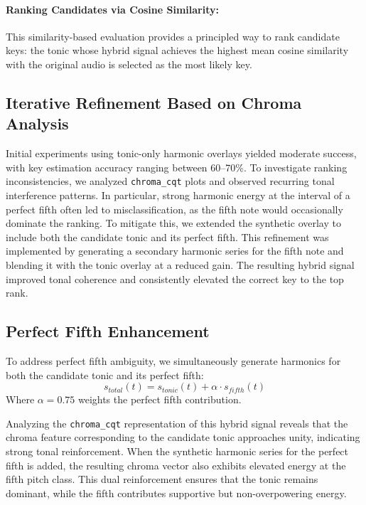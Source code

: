 \documentclass[10pt,twocolumn]{article}
\begin{document}
\paragraph{Ranking Candidates via Cosine Similarity:}
This similarity-based evaluation provides a principled way to rank candidate keys: the tonic whose hybrid signal achieves the highest mean cosine similarity with the original audio is selected as the most likely key.

\subsection{Iterative Refinement Based on Chroma Analysis}\label{subsec:iterative-refinement}
Initial experiments using tonic-only harmonic overlays yielded moderate success, with key estimation accuracy ranging between 60--70\%.
To investigate ranking inconsistencies, we analyzed \texttt{chroma\_cqt} plots and observed recurring tonal interference patterns.
In particular, strong harmonic energy at the interval of a perfect fifth often led to misclassification, as the fifth note would occasionally dominate the ranking.
To mitigate this, we extended the synthetic overlay to include both the candidate tonic and its perfect fifth.
This refinement was implemented by generating a secondary harmonic series for the fifth note and blending it with the tonic overlay at a reduced gain.
The resulting hybrid signal improved tonal coherence and consistently elevated the correct key to the top rank.

\subsection{Perfect Fifth Enhancement}\label{subsec:perfect-fifth-enhancement}
To address perfect fifth ambiguity, we simultaneously generate harmonics for both the candidate tonic and its perfect fifth:
\begin{equation}
s_{total}(t) = s_{tonic}(t) + \alpha \cdot s_{fifth}(t)\label{eq:equation}
\end{equation}
Where $\alpha = 0.75$ weights the perfect fifth contribution.

Analyzing the \texttt{chroma\_cqt} representation of this hybrid signal reveals that the chroma feature corresponding to the candidate tonic approaches unity, indicating strong tonal reinforcement. When the synthetic harmonic series for the perfect fifth is added, the resulting chroma vector also exhibits elevated energy at the fifth pitch class. This dual reinforcement ensures that the tonic remains dominant, while the fifth contributes supportive but non-overpowering energy.
\end{document}
